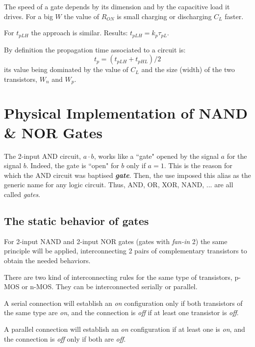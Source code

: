 The speed of a gate depends by its dimension and by the capacitive load
it drives. For a big $W$ the value of $R_{ON}$ is small charging or
discharging $C_{L}$ faster.

For $t_{pLH}$ the approach is similar. Results: $t_{pLH} = k_p \tau_{pL}$.

By definition the propagation time associated to a circuit is: $$t_p = (t_{pLH} + t_{pHL})/2$$
its value being dominated by the value of $C_L$ and the size (width) of the two transistors, $W_n$ and $W_p$.



\section{Physical Implementation of NAND \& NOR Gates}

The 2-input AND circuit, $a \cdot b$, works like a ``gate" opened by the signal $a$ for the signal $b$. Indeed, the gate is ``open" for $b$ only if $a = 1$. This is the reason for which the AND circuit was baptised {\bf {\em gate}}. Then, the use imposed this alias as the generic name for any logic circuit. Thus, AND, OR, XOR, NAND, ... are all called {\em gates}.


\subsection{The static behavior of gates}


For 2-input NAND and 2-input NOR gates (gates with {\em fan-in} 2) the same principle will be
applied, interconnecting 2 pairs of complementary transistors to
obtain the needed behaviors.

There are two kind of interconnecting rules for the same type of
transistors, p-MOS or n-MOS. They can be interconnected serially
or parallel.

A serial connection will establish an {\em on} configuration only
if both transistors of the same type are {\em on}, and the
connection is {\em off} if at least one transistor is {\em off}.

A parallel connection will establish an {\em on} configuration if
at least one is {\em on}, and the connection is {\em off} only if
both are {\em off}.


